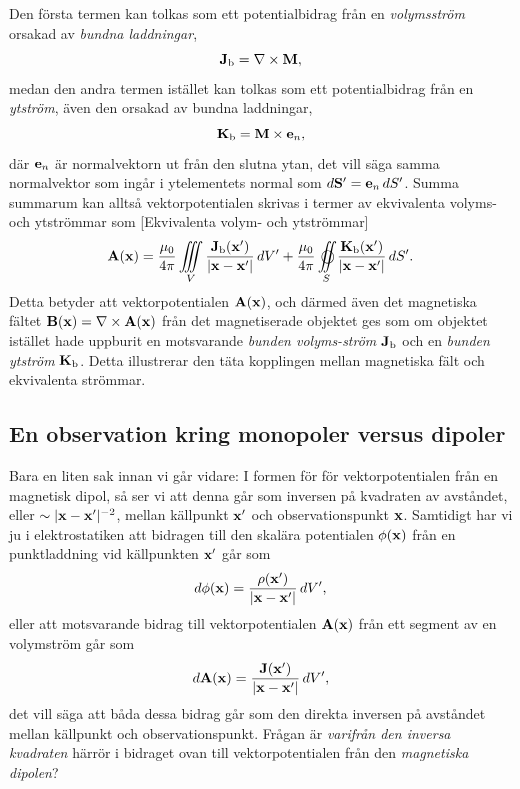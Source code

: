 Den f{\"o}rsta termen kan tolkas som ett potentialbidrag fr{\aa}n en
{\it volymsstr{\"o}m} orsakad av {\it bundna
laddningar},
$$
  {\bf J}_{\rm b}=\nabla\times{\bf M},
$$
medan den andra termen ist{\"a}llet kan tolkas som ett potentialbidrag fr{\aa}n
en {\it ytstr{\"o}m}, {\"a}ven den orsakad av bundna
laddningar,
$$
  {\bf K}_{\rm b}={\bf M}\times{\bf e}_n,
$$
d{\"a}r ${\bf e}_n$ {\"a}r normalvektorn ut fr{\aa}n den slutna ytan, det
vill s{\"a}ga samma normalvektor som ing{\aa}r i ytelementets normal som
$d{\bf S}'={\bf e}_n\,dS'$. Summa summarum kan allts{\aa} vektorpotentialen
skrivas i termer av ekvivalenta volyms- och ytstr{\"o}mmar som
[Ekvivalenta volym- och ytstr{\"o}mmar]
$$
  {\bf A}({\bf x}) = {{\mu_0}\over{4\pi}}\iiint_V
    {{{\bf J}_{\rm b}({\bf x}')}\over{|{\bf x}-{\bf x}'|}}\,dV'
  +{{\mu_0}\over{4\pi}}\oiint_S
    {{{\bf K}_{\rm b}({\bf x}')}\over{|{\bf x}-{\bf x}'|}}\,dS'.
$$
Detta betyder att vektorpotentialen ${\bf A}({\bf x})$, och d{\"a}rmed {\"a}ven
det magnetiska f{\"a}ltet ${\bf B}({\bf x})=\nabla\times{\bf A}({\bf x})$
fr{\aa}n det magnetiserade objektet ges som om objektet ist{\"a}llet hade
uppburit en motsvarande {\it bunden volyms-str{\"o}m} ${\bf J}_{\rm b}$ och
en {\it bunden ytstr{\"o}m} ${\bf K}_{\rm b}$. Detta illustrerar den t{\"a}ta
kopplingen mellan magnetiska f{\"a}lt och ekvivalenta str{\"o}mmar.
\vfill\eject

\subsection{En observation kring monopoler versus dipoler}
Bara en liten sak innan vi g{\aa}r vidare: I formen f{\"o}r f{\"o}r
vektorpotentialen fr{\aa}n en magnetisk dipol, s{\aa} ser vi att denna g{\aa}r
som inversen p{\aa} kvadraten av avst{\aa}ndet, eller
$\sim|{\bf x}-{\bf x}'|^{-2}$, mellan k{\"a}llpunkt ${\bf x}'$ och
observationspunkt ${\bf x}$.
Samtidigt har vi ju i elektrostatiken att bidragen till den skal{\"a}ra
potentialen $\phi({\bf x})$ fr{\aa}n en punktladdning vid k{\"a}llpunkten
${\bf x}'$ g{\aa}r som
$$
  d\phi({\bf x})={{\rho({\bf x}')}\over{|{\bf x}-{\bf x}'|}}\,dV',
$$
eller att motsvarande bidrag till vektorpotentialen ${\bf A}({\bf x})$ fr{\aa}n
ett segment av en volymstr{\"o}m g{\aa}r som
$$
  d{\bf A}({\bf x})={{{\bf J}({\bf x}')}\over{|{\bf x}-{\bf x}'|}}\,dV',
$$
det vill s{\"a}ga att b{\aa}da dessa bidrag g{\aa}r som den direkta inversen
p{\aa} avst{\aa}ndet mellan k{\"a}llpunkt och observationspunkt.
Fr{\aa}gan {\"a}r {\it varifr{\aa}n den inversa kvadraten} h{\"a}rr{\"o}r i
bidraget ovan till vektorpotentialen fr{\aa}n den {\it magnetiska dipolen}?

